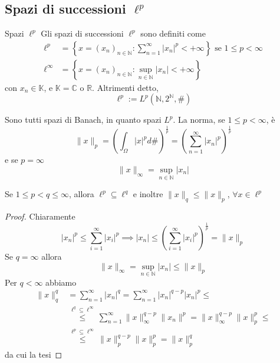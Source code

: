 \subsection{Spazi di successioni \(\ell^{p}\) }
\begin{definition}{Spazi \(\ell^{p}\)}
    Gli spazi di successioni \(\ell^{p}\) sono definiti come
    \begin{align*}
        \ell^{p} &= \left\{x = {(x_{n})}_{n \in \mathbb{N}} : \sum_{n=1}^{\infty}
        |x_{n}|^{p} < +\infty \right\} \text{ se } 1 \le p < \infty \\
            \ell^{\infty} &= \left\{x = {(x_{n})}_{n \in \mathbb{N}} : \sup_{n \in
        \mathbb{N}} |x_{n}| < +\infty\right\} 
    \end{align*}
    con \(x_{n} \in \mathbb{K}\), e \(\mathbb{K}= \mathbb{C}\) o \(\mathbb{R}\).
    Altrimenti detto, 
    \[
        \ell^{p} := L^{p}{\left( \mathbb{N}, 2^{\mathbb{N}}, \# \right)} 
    \]
\end{definition}
Sono tutti spazi di Banach, in quanto spazi \(L^{p}\). La norma, se \(1 \le p <
\infty\), è
\[
    \|x\|_p = {\left( \int_{\Omega} |x|^{p} d\#  \right)} ^{\frac{1}{p}} =
    {\left( \sum_{n=1}^{\infty} |x_{n}|^{p}  \right)} ^{\frac{1}{p}} 
\]
e se \(p = \infty\) 
\[
    \|x\|_{\infty} = \sup_{n \in \mathbb{N}} |x_{n}|
\]
\begin{proposition}
    Se \(1 \le p < q \le \infty\), allora \(\ell^{p} \subseteq \ell^{q}\) e
    inoltre \(\|x\|_q \le \|x\|_p\), \(\forall x \in \ell^{p}\) 
\end{proposition}
\begin{proof}
    Chiaramente
    \[
       |x_{n}|^{p} \le \sum_{i=1}^{\infty} |x_{i}|^{p} \implies |x_{n}| \le
       {\left( \sum_{i=1}^{\infty} |x_{i}|^{p}  \right)}^{\frac{1}{p}} = \|x\|_p
    \]
    Se \(q = \infty\) allora 
    \[
        \|x\|_{\infty} = \sup_{n \in \mathbb{N}} |x_{n}| \le \|x\|_p
    \]
    Per \(q < \infty\) abbiamo
    \begin{align*}
        \|x\|_q^{q} &= \sum_{n=1}^{\infty} |x_{n}|^{q} = \sum_{n=1}^{\infty}
        |x_{n}|^{q-p}|x_{n}|^{p} \le \\ &\overset{\ell^{q} \subseteq \ell^{\infty} }{\le
        } \sum_{n=1}^{\infty} \|x\|_{\infty} ^{q-p} \|x_n\|^p = \|x\|_{\infty} ^{q-p}
        \|x\|_p^{p} \le \\
        &\overset{\ell^{p} \subseteq\ell^{\infty} }{\le } \|x\|_{p} ^{q-p} 
        \|x\|^{p}_p = \|x\|_p^{q} 
    \end{align*}
    da cui la tesi
\end{proof}
